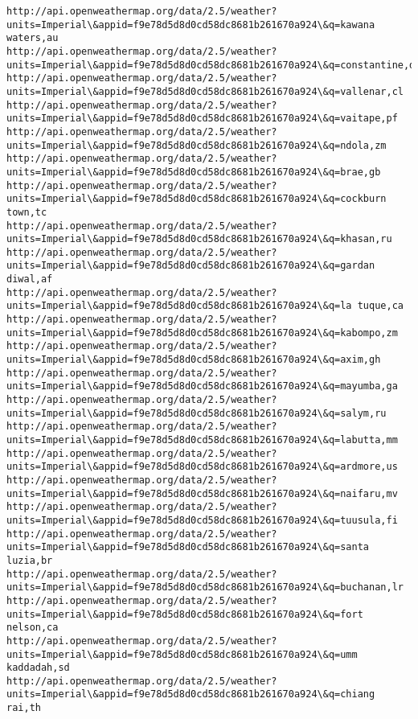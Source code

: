 \documentclass[11pt]{article}
\begin{document}
\begin{Verbatim}[commandchars=\\\{\}]
http://api.openweathermap.org/data/2.5/weather?units=Imperial\&appid=f9e78d5d8d0cd58dc8681b261670a924\&q=kawana waters,au
http://api.openweathermap.org/data/2.5/weather?units=Imperial\&appid=f9e78d5d8d0cd58dc8681b261670a924\&q=constantine,dz
http://api.openweathermap.org/data/2.5/weather?units=Imperial\&appid=f9e78d5d8d0cd58dc8681b261670a924\&q=vallenar,cl
http://api.openweathermap.org/data/2.5/weather?units=Imperial\&appid=f9e78d5d8d0cd58dc8681b261670a924\&q=vaitape,pf
http://api.openweathermap.org/data/2.5/weather?units=Imperial\&appid=f9e78d5d8d0cd58dc8681b261670a924\&q=ndola,zm
http://api.openweathermap.org/data/2.5/weather?units=Imperial\&appid=f9e78d5d8d0cd58dc8681b261670a924\&q=brae,gb
http://api.openweathermap.org/data/2.5/weather?units=Imperial\&appid=f9e78d5d8d0cd58dc8681b261670a924\&q=cockburn town,tc
http://api.openweathermap.org/data/2.5/weather?units=Imperial\&appid=f9e78d5d8d0cd58dc8681b261670a924\&q=khasan,ru
http://api.openweathermap.org/data/2.5/weather?units=Imperial\&appid=f9e78d5d8d0cd58dc8681b261670a924\&q=gardan diwal,af
http://api.openweathermap.org/data/2.5/weather?units=Imperial\&appid=f9e78d5d8d0cd58dc8681b261670a924\&q=la tuque,ca
http://api.openweathermap.org/data/2.5/weather?units=Imperial\&appid=f9e78d5d8d0cd58dc8681b261670a924\&q=kabompo,zm
http://api.openweathermap.org/data/2.5/weather?units=Imperial\&appid=f9e78d5d8d0cd58dc8681b261670a924\&q=axim,gh
http://api.openweathermap.org/data/2.5/weather?units=Imperial\&appid=f9e78d5d8d0cd58dc8681b261670a924\&q=mayumba,ga
http://api.openweathermap.org/data/2.5/weather?units=Imperial\&appid=f9e78d5d8d0cd58dc8681b261670a924\&q=salym,ru
http://api.openweathermap.org/data/2.5/weather?units=Imperial\&appid=f9e78d5d8d0cd58dc8681b261670a924\&q=labutta,mm
http://api.openweathermap.org/data/2.5/weather?units=Imperial\&appid=f9e78d5d8d0cd58dc8681b261670a924\&q=ardmore,us
http://api.openweathermap.org/data/2.5/weather?units=Imperial\&appid=f9e78d5d8d0cd58dc8681b261670a924\&q=naifaru,mv
http://api.openweathermap.org/data/2.5/weather?units=Imperial\&appid=f9e78d5d8d0cd58dc8681b261670a924\&q=tuusula,fi
http://api.openweathermap.org/data/2.5/weather?units=Imperial\&appid=f9e78d5d8d0cd58dc8681b261670a924\&q=santa luzia,br
http://api.openweathermap.org/data/2.5/weather?units=Imperial\&appid=f9e78d5d8d0cd58dc8681b261670a924\&q=buchanan,lr
http://api.openweathermap.org/data/2.5/weather?units=Imperial\&appid=f9e78d5d8d0cd58dc8681b261670a924\&q=fort nelson,ca
http://api.openweathermap.org/data/2.5/weather?units=Imperial\&appid=f9e78d5d8d0cd58dc8681b261670a924\&q=umm kaddadah,sd
http://api.openweathermap.org/data/2.5/weather?units=Imperial\&appid=f9e78d5d8d0cd58dc8681b261670a924\&q=chiang rai,th

\end{Verbatim}
\end{document}
